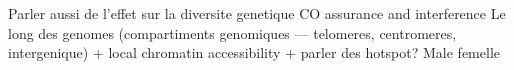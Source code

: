 Parler aussi de l'effet sur la diversite genetique
CO assurance and interference
Le long des genomes (compartiments genomiques — telomeres, centromeres, intergenique) + local chromatin accessibility + parler des hotspot?
Male femelle



%


%


